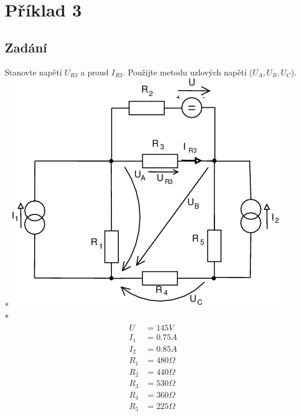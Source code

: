 \documentclass[a4paper, 10pt, fleqn]{article}
\begin{document}
\newpage
\section*{Příklad 3}
\subsection*{Zadání}
Stanovte napětí $U_{R3}$ a proud $I_{R3}$. Použijte metodu uzlových napětí
($U_{A}, U_{B}, U_{C}$).\\*
\includegraphics[scale=0.5]{IEL_OBR/3a.png} \\*
\begin{align*}
 U &= 145 V \\
 I_{1} &= 0.75 A \\
 I_{2} &= 0.85 A \\
 R_{1} &= 480 \Omega \\
 R_{2} &= 440 \Omega \\
 R_{3} &= 530 \Omega \\
 R_{4} &= 360 \Omega \\
 R_{5} &= 225 \Omega \\
\end{align*}
\end{document}
